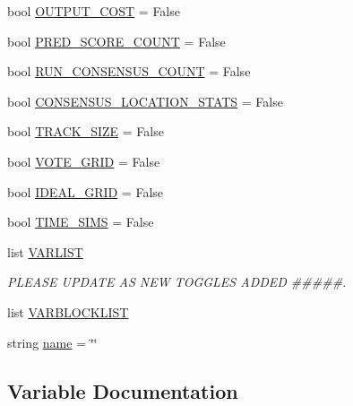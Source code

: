 \begin{DoxyCompactItemize}
bool \hyperlink{namespacedynamicfilterapp_1_1toggles_a2c3c37ecd0a669270751ba1fcdc0439f}{O\+U\+T\+P\+U\+T\+\_\+\+C\+O\+ST} = False
\item 
bool \hyperlink{namespacedynamicfilterapp_1_1toggles_a28f8ae2e702ca2e2112db9629538fc72}{P\+R\+E\+D\+\_\+\+S\+C\+O\+R\+E\+\_\+\+C\+O\+U\+NT} = False
\item 
bool \hyperlink{namespacedynamicfilterapp_1_1toggles_ab852b5e6373777202ed3eabdf511f026}{R\+U\+N\+\_\+\+C\+O\+N\+S\+E\+N\+S\+U\+S\+\_\+\+C\+O\+U\+NT} = False
\item 
bool \hyperlink{namespacedynamicfilterapp_1_1toggles_ad7f3dbdec359eb538bf1890793d541ad}{C\+O\+N\+S\+E\+N\+S\+U\+S\+\_\+\+L\+O\+C\+A\+T\+I\+O\+N\+\_\+\+S\+T\+A\+TS} = False
\item 
bool \hyperlink{namespacedynamicfilterapp_1_1toggles_a2051e4cd9bae895351ea7a73696fd815}{T\+R\+A\+C\+K\+\_\+\+S\+I\+ZE} = False
\item 
bool \hyperlink{namespacedynamicfilterapp_1_1toggles_abd2acb6c03d6ca650537592475fc69e4}{V\+O\+T\+E\+\_\+\+G\+R\+ID} = False
\item 
bool \hyperlink{namespacedynamicfilterapp_1_1toggles_a42311c82a77ac3b1c03bf7b9c6619be2}{I\+D\+E\+A\+L\+\_\+\+G\+R\+ID} = False
\item 
bool \hyperlink{namespacedynamicfilterapp_1_1toggles_a3dd608f63971ae7536ce7be96396c510}{T\+I\+M\+E\+\_\+\+S\+I\+MS} = False
\item 
list \hyperlink{namespacedynamicfilterapp_1_1toggles_abad4087652ccca08b33c499c7aad17b0}{V\+A\+R\+L\+I\+ST}
\begin{DoxyCompactList}\small\item\em P\+L\+E\+A\+SE U\+P\+D\+A\+TE AS N\+EW T\+O\+G\+G\+L\+ES A\+D\+D\+ED \#\#\#\#\#. \end{DoxyCompactList}\item 
list \hyperlink{namespacedynamicfilterapp_1_1toggles_aa02a2d2c1773074f98b23ad1078b99da}{V\+A\+R\+B\+L\+O\+C\+K\+L\+I\+ST}
\item 
string \hyperlink{namespacedynamicfilterapp_1_1toggles_a8ccf841cb59e451791bcb2e1ac4f1edc}{name} = \char`\"{}\char`\"{}
\end{DoxyCompactItemize}


\subsection{Variable Documentation}
\mbox{\label{namespacedynamicfilterapp_1_1toggles_ab64c8432c11e4b89425ac1f220ca01a9}} 

